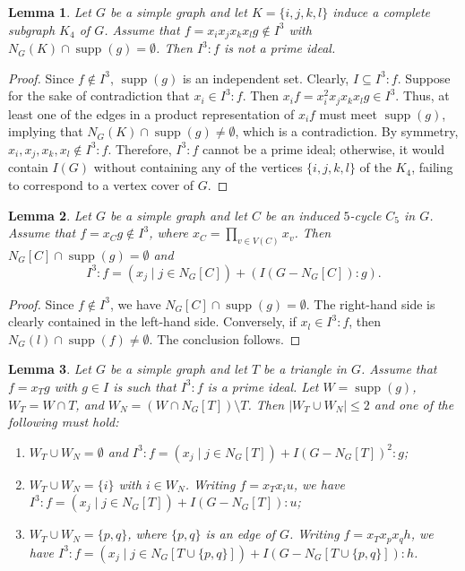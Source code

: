 \documentclass[12pt]{amsart}
\newtheorem{lemma}{Lemma}[section]
\begin{document}
\begin{lemma}\label{lem_colon_K_4}
Let $G$ be a simple graph and let $K = \{i, j, k, l\}$ induce a complete subgraph $K_4$ of $G$. Assume that $f = x_i x_j x_k x_l g \notin I^3$ with $N_G(K) \cap \operatorname{supp}(g) = \emptyset$. Then $I^3 : f$ is not a prime ideal.    
\end{lemma}

\begin{proof} 
Since $f \notin I^3$, $\operatorname{supp}(g)$ is an independent set. Clearly, $I \subseteq I^3 : f$. Suppose for the sake of contradiction that $x_i \in I^3 : f$. Then $x_i f = x_i^2 x_j x_k x_l g \in I^3$. Thus, at least one of the edges in a product representation of $x_i f$ must meet $\operatorname{supp}(g)$, implying that $N_G(K) \cap \operatorname{supp}(g) \neq \emptyset$, which is a contradiction. By symmetry, $x_i, x_j, x_k, x_l \notin I^3 : f$. Therefore, $I^3 : f$ cannot be a prime ideal; otherwise, it would contain $I(G)$ without containing any of the vertices $\{i, j, k, l\}$ of the $K_4$, failing to correspond to a vertex cover of $G$.
\end{proof}

\begin{lemma}\label{lem_colon_c_5} 
Let $G$ be a simple graph and let $C$ be an induced $5$-cycle $C_5$ in $G$. Assume that $f = x_C g \notin I^3$, where $x_C = \prod_{v \in V(C)} x_v$. Then $N_G[C] \cap \operatorname{supp}(g) = \emptyset$ and 
$$I^3 : f = (x_j \mid j \in N_G[C]) + (I(G - N_G[C]) : g).$$
\end{lemma}

\begin{proof}
Since $f \notin I^3$, we have $N_G[C] \cap \operatorname{supp}(g) = \emptyset$. The right-hand side is clearly contained in the left-hand side. Conversely, if $x_l \in I^3 : f$, then $N_G(l) \cap \operatorname{supp}(f) \neq \emptyset$. The conclusion follows.
\end{proof}

\begin{lemma}\label{lem_colon_t_e}
Let $G$ be a simple graph and let $T$ be a triangle in $G$. Assume that $f = x_T g$ with $g \in I$ is such that $I^3 : f$ is a prime ideal. Let $W = \operatorname{supp}(g)$, $W_T = W \cap T$, and $W_N = (W \cap N_G[T]) \setminus T$. Then $|W_T \cup W_N| \le 2$ and one of the following must hold:
\begin{enumerate}
    \item $W_T \cup W_N = \emptyset$ and $I^3 : f = (x_j \mid j \in N_G[T]) + I(G - N_G[T])^2 : g$;
    \item $W_T \cup W_N = \{i\}$ with $i \in W_N$. Writing $f = x_T x_i u$, we have $I^3 : f = (x_j \mid j \in N_G[T]) + I(G - N_G[T]) : u$;
    \item $W_T \cup W_N = \{p,q\}$, where $\{p,q\}$ is an edge of $G$. Writing $f = x_T x_p x_q h$, we have $I^3 : f = (x_j \mid j \in N_G[T \cup \{p,q\}]) + I(G - N_G[T \cup \{p,q\}]) : h$.
\end{enumerate}
\end{lemma}
\end{document}
